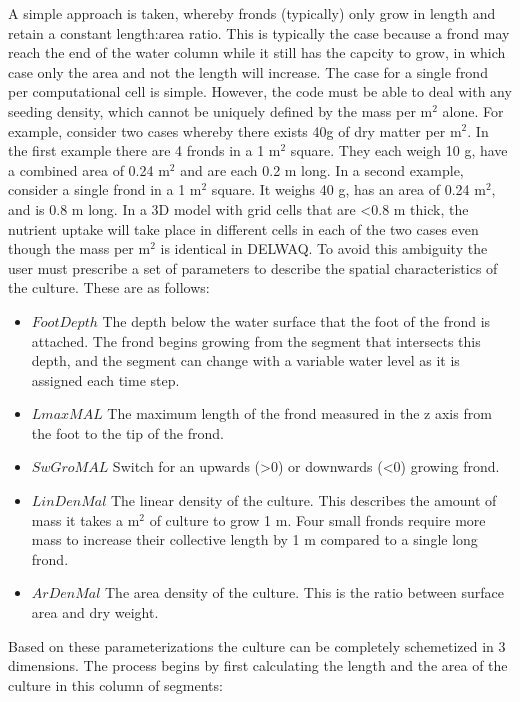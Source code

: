\documentclass{deltares_manual}
\begin{document}
A simple approach is taken, whereby fronds (typically) only grow in length and retain a constant length:area ratio. This is typically the case because a frond may reach the end of the water column while it still has the capcity to grow, in which case only the area and not the length will increase. The case for a single frond per computational cell is simple. However, the code must be able to deal with any seeding density, which cannot be uniquely defined by the mass per m$^{2}$ alone. For example, consider two cases whereby there exists 40g of dry matter per m$^{2}$. In the first example there are 4 fronds in a 1 m$^{2}$ square. They each weigh 10 g, have a combined area of 0.24 m$^{2}$ and are each 0.2 m long. In a second example, consider a single frond in a 1 m$^{2}$ square. It weighs 40 g, has an area of 0.24 m$^{2}$, and is 0.8 m long. In a 3D model with grid cells that are \textless 0.8 m thick, the nutrient uptake will take place in different cells in each of the two cases even though the mass per m$^{2}$ is identical in DELWAQ. To avoid this ambiguity the user must prescribe a set of parameters to describe the spatial characteristics of the culture. These are as follows:

\begin{itemize}
	\item $FootDepth$ The depth below the water surface that the foot of the frond is attached. The frond begins growing from the segment that intersects this depth, and the segment can change with a variable water level as it is assigned each time step.
	\item $LmaxMAL$ The maximum length of the frond measured in the z axis from the foot to the tip of the frond.
	\item $SwGroMAL$ Switch for an upwards (\textgreater 0) or downwards (\textless 0) growing frond.
	\item $LinDenMal$ The linear density of the culture. This describes the amount of mass it takes a m$^{2}$ of culture to grow 1 m. Four small fronds require more mass to increase their collective length by 1 m compared to a single long frond.
	\item $ArDenMal$ The area density of the culture. This is the ratio between surface area and dry weight.
\end{itemize}

Based on these parameterizations the culture can be completely schemetized in 3 dimensions. The process begins by first calculating the length and the area of the culture in this column of segments:
\end{document}
